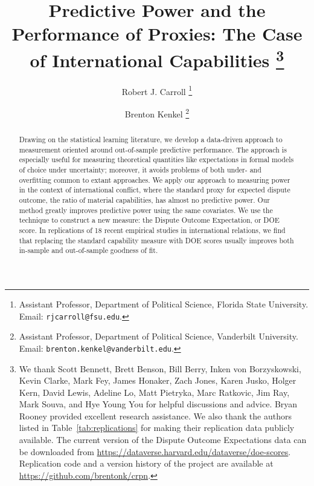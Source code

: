 \documentclass[11pt,oneside]{article}
\title{
  Predictive Power and the Performance of Proxies:  The Case of International Capabilities%
  \thanks{%
    We thank Scott Bennett, Brett Benson, Bill Berry, Inken von Borzyskowski, Kevin Clarke, Mark Fey, James Honaker, Zach Jones, Karen Jusko, Holger Kern, David Lewis, Adeline Lo, Matt Pietryka, Marc Ratkovic, Jim Ray, Mark Souva, and Hye Young You for helpful discussions and advice.
    Bryan Rooney provided excellent research assistance.
    We also thank the authors listed in Table~\ref{tab:replications} for making their replication data publicly available.
    The current version of the Dispute Outcome Expectations data can be downloaded from \url{https://dataverse.harvard.edu/dataverse/doe-scores}.
    Replication code and a version history of the project are available at \url{https://github.com/brentonk/crpn}.
  }%
}
\author{%
  Robert J. Carroll%
  \thanks{%
    Assistant Professor, Department of Political Science, Florida State University.  Email:  \nolinkurl{rjcarroll@fsu.edu}.
  }%
  \and%
  Brenton Kenkel%
  \thanks{
    Assistant Professor, Department of Political Science, Vanderbilt University.
    Email: \nolinkurl{brenton.kenkel@vanderbilt.edu}.
  }%
}
\begin{document}
\maketitle

\begin{abstract}
  \noindent Drawing on the statistical learning literature, we develop a data-driven approach to measurement oriented around out-of-sample predictive performance.
  The approach is especially useful for measuring theoretical quantities like expectations in formal models of choice under uncertainty; moreover, it avoids problems of both under- and overfitting common to extant approaches.
  We apply our approach to measuring power in the context of international conflict, where the standard proxy for expected dispute outcome, the ratio of material capabilities, has almost no predictive power.
  Our method greatly improves predictive power using the same covariates.
  We use the technique to construct a new measure:  the Dispute Outcome Expectation, or DOE score.
  In replications of 18 recent empirical studies in international relations, we find that replacing the standard capability measure with DOE scores usually improves both in-sample and out-of-sample goodness of fit.
\end{abstract}
\thispagestyle{empty}
\newpage
\setcounter{page}{1}



















\clearpage
\appendix


\newpage


\end{document}
